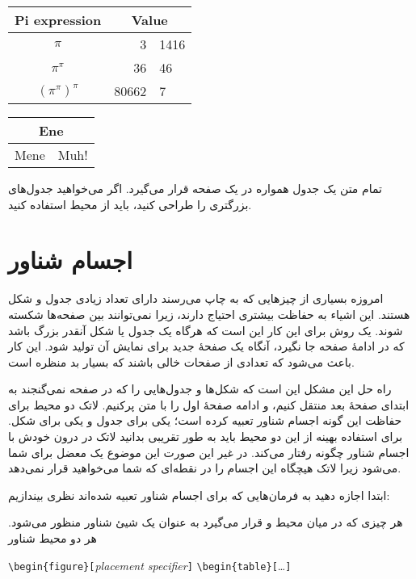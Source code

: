 \begin{example}
\begin{tabular}{c r @{.} l}
Pi expression       &
\multicolumn{2}{c}{Value} \\
\hline
$\pi$               & 3&1416  \\
$\pi^{\pi}$         & 36&46   \\
$(\pi^{\pi})^{\pi}$ & 80662&7 \\
\end{tabular}
\end{example}

\begin{example}
\begin{tabular}{|c|c|}
\hline
\multicolumn{2}{|c|}{Ene} \\
\hline
Mene & Muh! \\
\hline
\end{tabular}
\end{example}

تمام متن یک جدول همواره در یک صفحه قرار می‌گیرد. اگر می‌خواهید جدول‌های بزرگتری را طراحی کنید، باید از محیط 
استفاده کنید.
\section{اجسام شناور}
امروزه بسیاری از چیز‌هایی که به چاپ می‌رسند دارای تعداد زیادی جدول و شکل هستند. این اشیاء به حفاظت بیشتری احتیاج دارند، زیرا نمی‌توانند بین صفحه‌ها شکسته شوند. یک روش برای این کار این است که هرگاه یک جدول یا شکل آنقدر بزرگ باشد که در ادامهٔ صفحه جا نگیرد، آنگاه یک صفحهٔ جدید برای نمایش آن تولید شود. این کار باعث می‌شود که تعدادی از صفحات خالی باشند که بسیار بد منظره است.

راه حل این مشکل این است که شکل‌ها و جدول‌هایی را که در صفحه نمی‌گنجند به ابتدای صفحهٔ بعد منتقل کنیم، و ادامه صفحهٔ اول را با متن پرکنیم. لاتک دو محیط برای حفاظت این گونه اجسام شناور تعبیه کرده است؛ یکی برای جدول و یکی برای شکل. برای استفاده بهینه از این دو محیط باید به طور تقریبی بدانید لاتک در درون خودش با اجسام شناور چگونه رفتار می‌کند. در غیر این صورت این موضوع یک معضل برای شما می‌شود زیرا لاتک هیچگاه این اجسام را در نقطه‌ای که شما می‌خواهید قرار نمی‌دهد.

\bigskip
ابتدا اجازه دهید به فرمان‌هایی که برای اجسام شناور تعبیه شده‌اند نظری بیندازیم:

هر چیزی که در میان محیط 
 و 
قرار می‌گیرد به عنوان یک شییٔ شناور منظور می‌شود. هر دو محیط شناور 

\begin{lscommand}
\verb|\begin{figure}[|\emph{placement specifier}\verb|]| 
\verb|\begin{table}[|\ldots\verb|]|
\end{lscommand}

